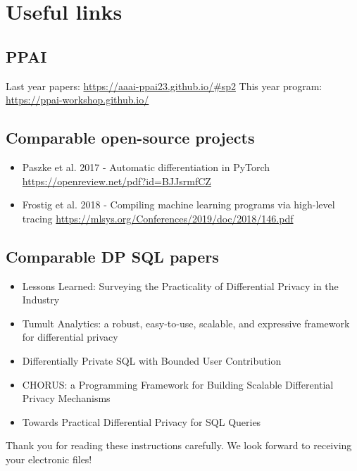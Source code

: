 \documentclass[letterpaper]{article} %
\begin{document}
\section*{Useful links}
\subsection{PPAI}
Last year papers:
\url{https://aaai-ppai23.github.io/#sp2}
This year program:
\url{https://ppai-workshop.github.io/}

\subsection{Comparable open-source projects}

\begin{itemize}
    \item Paszke et al. 2017 - Automatic differentiation in PyTorch \url{https://openreview.net/pdf?id=BJJsrmfCZ}
    \item Frostig et al. 2018 - Compiling machine learning programs via high-level tracing \url{https://mlsys.org/Conferences/2019/doc/2018/146.pdf}
\end{itemize}

\subsection{Comparable DP SQL papers}

\begin{itemize}
    \item Lessons Learned: Surveying the Practicality of Differential Privacy in the Industry \cite{garrido2022lessons}
    \item Tumult Analytics: a robust, easy-to-use, scalable, and expressive framework for differential privacy \cite{berghel2022tumult}
    \item Differentially Private SQL with Bounded User Contribution \cite{wilson2019differentially}
    \item CHORUS: a Programming Framework for Building Scalable Differential Privacy Mechanisms \cite{johnson2020chorus}
    \item Towards Practical Differential Privacy for SQL Queries \cite{johnson2018towards}
\end{itemize}

\bigskip
\noindent Thank you for reading these instructions carefully. We look forward to receiving your electronic files!

% 

\appendix
\end{document}
